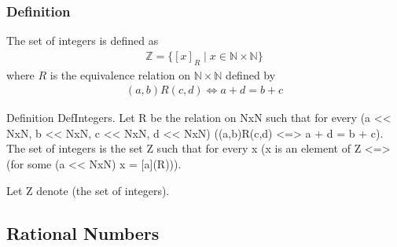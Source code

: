 \subsubsection{Definition}
\begin{true}
The set of integers is defined as
\begin{align*}
    \mathbb{Z} = \{ [x]_R \mid x \in \mathbb{N} \times \mathbb{N} \}
\end{align*}
where $R$ is the equivalence relation on $\mathbb{N} \times \mathbb{N}$ defined by
\begin{align*}
    (a,b)R(c,d) \iff a + d = b + c
\end{align*}
\end{true}
\begin{forthel}
Definition DefIntegers.
    Let R be the relation on NxN such that
    for every (a << NxN, b << NxN, c << NxN, d << NxN)
    ((a,b)R(c,d) <=> a + d = b + c).
    The set of integers is the set Z such that
    for every x (x is an element of Z <=> (for some (a << NxN) x = [a](R))).

Let Z denote (the set of integers).
\end{forthel}

\subsection{Rational Numbers}
